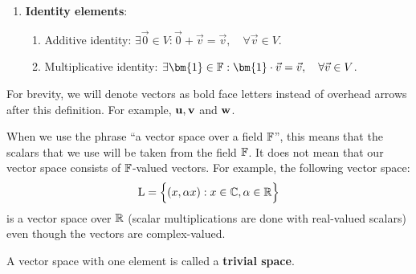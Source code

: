 \begin{definition}
\begin{enumerate}
		\item \textbf{Identity elements}:
		\begin{enumerate}[label=\roman*]\addtocounter{enumii}{8}
			\item Additive identity: $\exists\vec{0} \in V: \vec{0} + \vec{v} = \vec{v}, \quad \forall \vec{v}\in V$.
			\item Multiplicative identity: $\exists \bm{1}\in\field: \bm{1}\cdot\vec{v} = \vec{v},\quad \forall \vec{v} \in V$.	
		\end{enumerate} 
	\end{enumerate} 

	\noindent For brevity, we will denote vectors as bold face letters instead of overhead arrows after this definition. For example, ${\bf u}, {\bf v}$ and ${\bf w}$.
\end{definition} 

\begin{remark}
	When we use the phrase ``a vector space over a field $\mathbb{F}$'', this means that the scalars that we use will be taken from the field $\mathbb{F}$. It does not mean that our vector space consists of $\mathbb{F}$-valued vectors. For example, the following vector space:
	\begin{align*}
		\mathrm{L} = \Big\{ (x, \alpha x) : x\in\mathbb{C}, \alpha\in\mathbb{R} \Big\}	
	\end{align*}
	is a vector space over $\mathbb{R}$ (scalar multiplications are done with real-valued scalars) even though the vectors are complex-valued.
\end{remark} 

\begin{remark}
	A vector space with one element is called a \textbf{trivial space}.	
\end{remark} 

